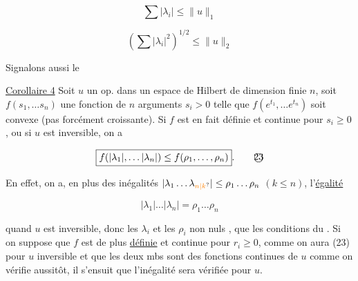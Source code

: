 \[
\boxed{\sum|\lambda_i|\leq\|u\|_1}\tag*{(21)}
\]

\[
\boxed{\left(\sum|\lambda_i|^2\right)^{1/2}\leq\|u\|_2}\tag*{(22)}
\]

Signalons aussi le


\uline{Corollaire 4} Soit $u$ un op.  dans un espace de Hilbert de dimension finie $n$,  soit $f(s_1,\ldots s_n)$  une fonction de $n$ arguments $s_i>0$ telle que $f(e^{t_1},\ldots e^{t_n})$ soit convexe (pas forcément croissante). Si $f$ est en fait définie et continue pour  $s_i\geq0$, ou si $u$ est inversible, on a

\[
\boxed{f(|\lambda_1|,\ldots|\lambda_n|)\leq f(\rho_1,\ldots,\rho_n)}.\tag*{\textcircled{23}}
\]

 En effet, on a, en plus des inégalités $|\lambda_1\ldots\lambda_{\unsure{n|k}}|\leq\rho_1\ldots\rho_n$ $(k\leq n)$, l'\uline{égalité}


\[
|\lambda_1|\ldots|\lambda_n|=\rho_1\ldots\rho_n\tag*{(24)}
\]



quand $u$ est inversible,  donc  les $\lambda_i$ et les $\rho_i$ non nuls , que les conditions du  . Si on suppose que $f$ est de plus \uline{définie} et continue pour $r_i\geq0$, comme on aura (23) pour  $u$ inversible et que les deux mbs sont des fonctions continues de $u$ comme on vérifie aussitôt, il s'ensuit que l'inégalité sera vérifiée pour  $u$. 

